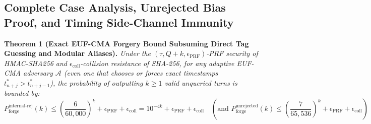 \documentclass[9pt,a4paper]{extarticle}
\begin{document}
\subsection{Complete Case Analysis, Unrejected Bias Proof, and Timing Side-Channel Immunity}
\textbf{Theorem 1 (Exact EUF-CMA Forgery Bound Subsuming Direct Tag Guessing and Modular Aliases).} \emph{Under the $(\tau, Q+k, \epsilon_{\text{PRF}})$-PRF security of HMAC-SHA256 and $\epsilon_{\text{coll}}$-collision resistance of SHA-256, for any adaptive EUF-CMA adversary $\mathcal{A}$ (even one that chooses or forces exact timestamps $t_{n+j}^* > t_{n+j-1}^*$), the probability of outputting $k \ge 1$ valid unqueried turns is bounded by:}
\begin{equation}
  P_{\text{forge}}^{\text{internal-rej}}(k) \le \left(\frac{6}{60{,}000}\right)^k + \epsilon_{\text{PRF}} + \epsilon_{\text{coll}} = 10^{-4k} + \epsilon_{\text{PRF}} + \epsilon_{\text{coll}}
  \quad \left(\text{and } P_{\text{forge}}^{\text{unrejected}}(k) \le \left(\frac{7}{65{,}536}\right)^k + \epsilon_{\text{PRF}} + \epsilon_{\text{coll}}\right)
  \label{eq:forgery_bound}
\end{equation}
\end{document}

